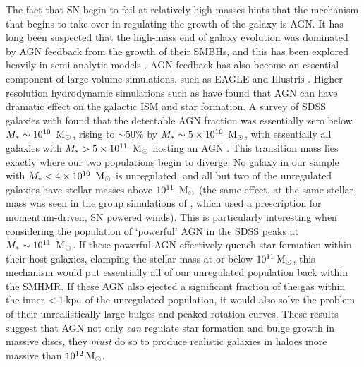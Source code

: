 The fact that SN begin to fail at relatively high masses hints that the
mechanism that begins to take over in regulating the growth of the galaxy is
AGN.  It has long been suspected that the high-mass end of galaxy evolution was
dominated by AGN feedback from the growth of their SMBHs, and this has been
explored heavily in semi-analytic models
\citep{Bower2006,Croton2006,Shankar2006}.  AGN feedback has also become an
essential component of large-volume simulations, such as EAGLE
\citep{Schaye2015} and Illustris \citep{Sijacki2015}.  Higher resolution
hydrodynamic simulations such as \citet{DiMatteo2005,Ciotti2010,Hopkins2016}
have found that AGN can have dramatic effect on the galactic ISM and star
formation.  A survey of SDSS galaxies with found that the detectable AGN
fraction was essentially zero below $M_*\sim10^{10}\;\>{\rm M_{\odot}}$, rising to
$\sim50\%$ by $M_*\sim5\times10^{10}\;\>{\rm M_{\odot}}$, with essentially all galaxies
with $M_*>5\times10^{11}\;\>{\rm M_{\odot}}$ hosting an AGN \citep{Kauffmann2003b}.  This
transition mass lies exactly where our two populations begin to diverge.  No
galaxy in our sample with $M_*<4\times10^{10}\;\>{\rm M_{\odot}}$ is unregulated, and all
but two of the unregulated galaxies have stellar masses above $10^{11}\;\>{\rm M_{\odot}}$
(the same effect, at the same stellar mass was seen in the group simulations of
\citep{Liang2016}, which used a prescription for momentum-driven, SN powered
winds).  This is particularly interesting when considering the population of
`powerful' AGN in the SDSS peaks at $M_*\sim10^{11}\;\>{\rm M_{\odot}}$.  If these
powerful AGN effectively quench star formation within their host galaxies,
clamping the stellar mass at or below $10^{11}\>{\rm M_{\odot}}$, this mechanism would put
essentially all of our unregulated population back within the
\citet{Hudson2015} SMHMR.  If these AGN also ejected a significant fraction of
the gas within the inner $<1\>{\rm kpc}$ of the unregulated population, it would also
solve the problem of their unrealistically large bulges and peaked rotation
curves.  These results suggest that AGN not only {\it can} regulate star
formation and bulge growth in massive discs, they {\it must} do so to produce
realistic galaxies in haloes more massive than $10^{12}\>{\rm M_{\odot}}$.

